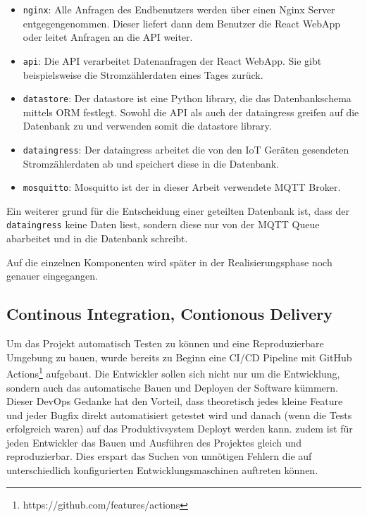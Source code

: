 \begin{itemize}
    \item \texttt{nginx}:
        Alle Anfragen des Endbenutzers werden über einen Nginx Server
        entgegengenommen. Dieser liefert dann dem Benutzer die React WebApp
        oder leitet Anfragen an die \ac{API} weiter.

    \item \texttt{api}:
        Die \ac{API} verarbeitet Datenanfragen der React WebApp. Sie gibt
        beispielsweise die Stromzählerdaten eines Tages zurück.

    \item \texttt{datastore}:
        Der datastore ist eine Python library, die das Datenbankschema mittels \ac{ORM} festlegt.
        Sowohl die \ac{API} als auch der dataingress greifen auf die Datenbank zu
        und verwenden somit die datastore library.

    \item \texttt{dataingress}:
        Der dataingress arbeitet die von den \ac{IoT} Geräten gesendeten
        Stromzählerdaten ab und speichert diese in die Datenbank.

    \item \texttt{mosquitto}:
        Mosquitto ist der in dieser Arbeit verwendete \ac{MQTT} Broker.
\end{itemize}

Ein weiterer grund für die Entscheidung einer geteilten Datenbank ist,
dass der \texttt{dataingress} keine Daten liest, sondern diese nur von
der \ac{MQTT} Queue abarbeitet und in die Datenbank schreibt.

Auf die einzelnen Komponenten wird später in der Realisierungsphase noch genauer
eingegangen.

\subsection{Continous Integration, Contionous Delivery}

Um das Projekt automatisch Testen zu können und eine Reproduzierbare Umgebung zu bauen,
wurde bereits zu Beginn eine \ac{CI/CD} Pipeline mit GitHub Actions\footnote{https://github.com/features/actions}
aufgebaut.
Die Entwickler sollen sich nicht nur um die Entwicklung, sondern auch das automatische Bauen und Deployen der
Software kümmern. Dieser DevOps Gedanke hat den Vorteil, dass
theoretisch jedes kleine Feature und jeder Bugfix direkt automatisiert getestet
wird und danach (wenn die Tests erfolgreich waren) auf das Produktivsystem
Deployt werden kann. \cite{what_is_devops}
zudem ist für jeden Entwickler das Bauen und Ausführen des Projektes gleich und
reproduzierbar. Dies erspart das Suchen von unnötigen Fehlern die auf unterschiedlich
konfigurierten Entwicklungsmaschinen auftreten können.

